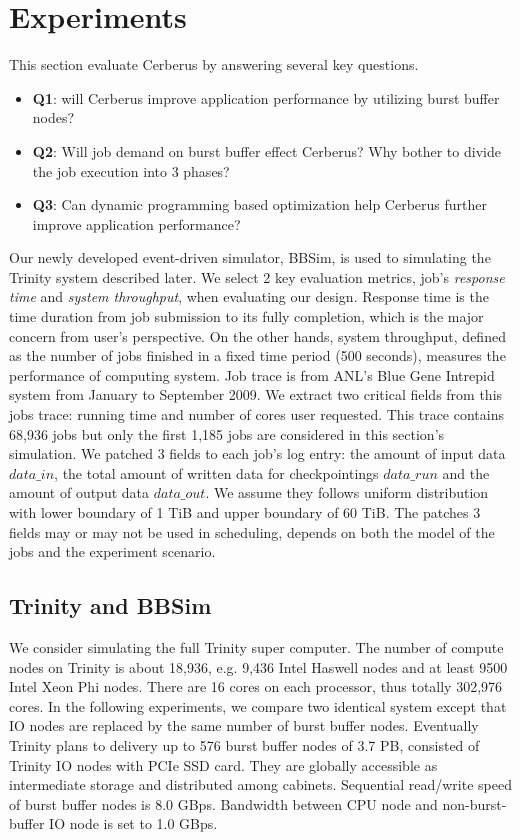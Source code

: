 \section{Experiments}
\label{Sec:Experiments}

This section evaluate Cerberus by answering several key questions.
\begin{itemize}
        \item \textbf{Q1}: will Cerberus improve application performance
                by utilizing burst buffer nodes?
        \item \textbf{Q2}: Will job demand on burst buffer effect Cerberus?
                Why bother to divide the job execution into 3 phases?
        \item \textbf{Q3}: Can dynamic programming based optimization
                help Cerberus further
improve application performance?
\end{itemize}
Our newly developed event-driven simulator, BBSim, is used to simulating
the Trinity system described later.
We select 2 key evaluation metrics, job's \textit{response time} and 
\textit{system throughput}, when evaluating our design.
Response time is the time duration from job submission to its fully completion,
which is the major concern from user's perspective.
On the other hands, system throughput, defined as the number of jobs finished in
a fixed time period (500 seconds), measures the performance of computing system.
Job trace is from ANL's Blue Gene Intrepid system
from January to September 2009\cite{JobTrace}.
We extract two critical fields from this jobs trace: running time and
number of cores user requested.
This trace contains 68,936 jobs but
only the first 1,185 jobs are considered in this section's simulation.
We patched 3 fields to each job's log entry: the amount of input data $data\_in$,
the total amount of written data for checkpointings $data\_run$
and the amount of output data $data\_out$.
We assume they follows uniform distribution with
lower boundary of 1 TiB and upper boundary of 60 TiB.
The patches 3 fields may or may not be used in scheduling,
depends on both the model of the jobs and the experiment scenario.


\subsection{Trinity and BBSim}
We consider simulating the full Trinity super computer\cite{TrinitySystem}.
The number of compute nodes on Trinity is about 18,936,
e.g. 9,436 Intel Haswell nodes
and at least 9500 Intel Xeon Phi nodes.
There are 16 cores on each processor, thus totally 302,976 cores.
In the following experiments, we compare two identical system except that
IO nodes are replaced by the same number of burst buffer nodes.
Eventually Trinity plans to delivery up to 576 burst buffer nodes of 3.7 PB,
consisted of Trinity IO nodes with PCIe SSD card.
They are globally accessible as intermediate storage and distributed among cabinets.
Sequential read/write speed of burst buffer nodes is 8.0 GBps.
Bandwidth between CPU node and non-burst-buffer IO node is set to 1.0 GBps.

